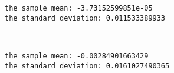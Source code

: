 \documentclass[a4paper,dvipdfmx]{jsarticle}
\newlength{\cellleftmargin}
\newlength{\smallerfontscale}
\def\smaller{\fontsize{\smallerfontscale}{\smallerfontscale}\selectfont}
\begin{document}
    \begin{addmargin}[\cellleftmargin]{0em}%
    {\smaller%
    \vspace{-1\smallerfontscale}%
    
    \begin{Verbatim}[commandchars=\\\{\}]
the sample mean: -3.73152599851e-05
the standard deviation: 0.011533389933

    \end{Verbatim}
}%
    \end{addmargin}%
    \begin{addmargin}[\cellleftmargin]{0em}%
    {\smaller%
    \vspace{-1\smallerfontscale}%
    
    \begin{center}
    \end{center}
    { \hspace*{\fill} \\}
    }%
    \end{addmargin}%
    \begin{addmargin}[\cellleftmargin]{0em}%
    {\smaller%
    \vspace{-1\smallerfontscale}%
    
    \begin{Verbatim}[commandchars=\\\{\}]
the sample mean: -0.00284901663429
the standard deviation: 0.0161027490365

    \end{Verbatim}
}%
    \end{addmargin}%
\end{document}

